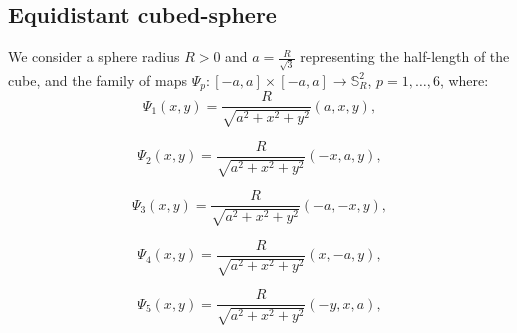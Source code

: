 \subsection{Equidistant cubed-sphere}
\label{equidistant-cs}

We consider a sphere radius $R>0$ and
$a = \frac{R}{\sqrt{3}}$ representing the half-length of 
the cube, and the family of maps
$\Psi_{p}: [-a,a] \times [-a,a] \to \mathbb{S}^2_R$, $p=1, \ldots, 6$,
where:
\begin{equation}
	\label{chp3-eqdistant-psi1}
	\Psi_{1}(x,y) = \frac{R}{\sqrt{a^2 + x^2 + y^2}}(a, x, y), 
\end{equation}

\begin{equation}
	\label{chp3-eqdistant-psi2}
	\Psi_{2}(x,y) = \frac{R}{\sqrt{a^2 + x^2 + y^2}}(-x, a, y), 
\end{equation}

\begin{equation}
	\label{chp3-eqdistant-psi3}
	\Psi_{3}(x,y) = \frac{R}{\sqrt{a^2 + x^2 + y^2}}(-a, -x, y), 
\end{equation}

\begin{equation}
	\label{chp3-eqdistant-psi4}
	\Psi_{4}(x,y) = \frac{R}{\sqrt{a^2 + x^2 + y^2}}(x, -a, y), 
\end{equation}

\begin{equation}
	\label{chp3-eqdistant-psi5}
	\Psi_{5}(x,y) = \frac{R}{\sqrt{a^2 + x^2 + y^2}}(-y, x, a), 
\end{equation}

